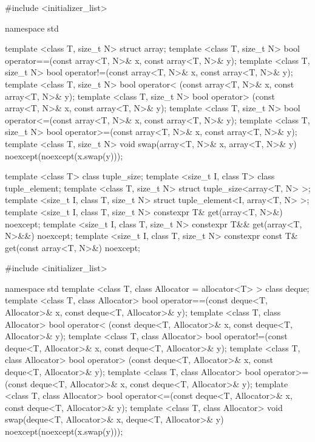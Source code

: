 %
%
\begin{codeblock}
#include <initializer_list>

namespace std {
  template <class T, size_t N> struct array;
  template <class T, size_t N>
    bool operator==(const array<T, N>& x, const array<T, N>& y);
  template <class T, size_t N>
    bool operator!=(const array<T, N>& x, const array<T, N>& y);
  template <class T, size_t N>
    bool operator< (const array<T, N>& x, const array<T, N>& y);
  template <class T, size_t N>
    bool operator> (const array<T, N>& x, const array<T, N>& y);
  template <class T, size_t N>
    bool operator<=(const array<T, N>& x, const array<T, N>& y);
  template <class T, size_t N>
    bool operator>=(const array<T, N>& x, const array<T, N>& y);
  template <class T, size_t N>
    void swap(array<T, N>& x, array<T, N>& y) noexcept(noexcept(x.swap(y)));

  template <class T> class tuple_size;
  template <size_t I, class T> class tuple_element;
  template <class T, size_t N>
    struct tuple_size<array<T, N> >;
  template <size_t I, class T, size_t N>
    struct tuple_element<I, array<T, N> >;
  template <size_t I, class T, size_t N>
    constexpr T& get(array<T, N>&) noexcept;
  template <size_t I, class T, size_t N>
    constexpr T&& get(array<T, N>&&) noexcept;
  template <size_t I, class T, size_t N>
    constexpr const T& get(const array<T, N>&) noexcept;
}
\end{codeblock}

%

\begin{codeblock}
#include <initializer_list>

namespace std {
  template <class T, class Allocator = allocator<T> > class deque;
  template <class T, class Allocator>
    bool operator==(const deque<T, Allocator>& x, const deque<T, Allocator>& y);
  template <class T, class Allocator>
    bool operator< (const deque<T, Allocator>& x, const deque<T, Allocator>& y);
  template <class T, class Allocator>
    bool operator!=(const deque<T, Allocator>& x, const deque<T, Allocator>& y);
  template <class T, class Allocator>
    bool operator> (const deque<T, Allocator>& x, const deque<T, Allocator>& y);
  template <class T, class Allocator>
    bool operator>=(const deque<T, Allocator>& x, const deque<T, Allocator>& y);
  template <class T, class Allocator>
    bool operator<=(const deque<T, Allocator>& x, const deque<T, Allocator>& y);
  template <class T, class Allocator>
    void swap(deque<T, Allocator>& x, deque<T, Allocator>& y)
      noexcept(noexcept(x.swap(y)));
}
\end{codeblock}

